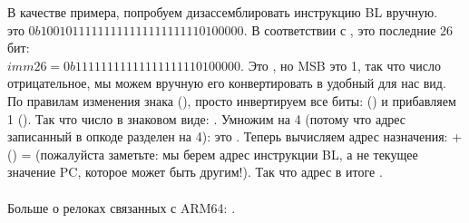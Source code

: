 В качестве примера, попробуем дизассемблировать инструкцию BL вручную.\\
 это $0b10010111111111111111111110100000$.
В соответствии с ,  это последние 26 бит:\\
$imm26 = 0b11111111111111111110100000$.
Это , но \ac{MSB} это 1, 
так что число отрицательное, мы можем вручную его конвертировать в удобный для нас вид.
По правилам изменения знака (), просто инвертируем все биты: () и прибавляем 1 ().
Так что число в знаковом виде: .
Умножим  на 4 (потому что адрес записанный в опкоде разделен на 4): это .
Теперь вычисляем адрес назначения:  + () =  
(пожалуйста заметьте: мы берем адрес инструкции BL, а не текущее значение \ac{PC}, которое может быть другим!).
Так что адрес в итоге .\\
\\
Больше о релоках связанных с ARM64: \ARMELF.
